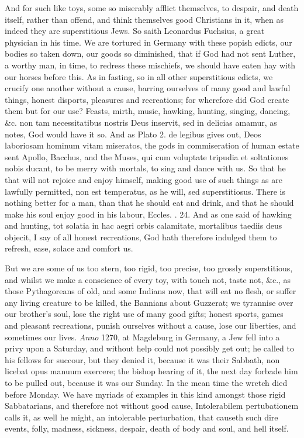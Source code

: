 {And for such like toys, some so miserably afflict themselves, to
despair, and death itself, rather than offend, and think themselves
good Christians in it, when as indeed they are superstitious Jews. So
saith Leonardus Fuchsius, a great physician in his time. We are
tortured in Germany with these popish edicts, our bodies so taken down,
our goods so diminished, that if God had not sent Luther, a worthy man,
in time, to redress these mischiefs, we should have eaten hay with our
horses before this. As in fasting, so in all other superstitious
edicts, we crucify one another without a cause, barring ourselves of
many good and lawful things, honest disports, pleasures and
recreations; for wherefore did God create them but for our use? Feasts,
mirth, music, hawking, hunting, singing, dancing, \&c. non tam
necessitatibus nostris Deus inservit, sed in delicias amamur, as \Seneca
notes, God would have it so. And as Plato 2. de legibus gives out, Deos
laboriosam hominum vitam miseratos, the gods in commiseration of human
estate sent Apollo, Bacchus, and the Muses, qui cum voluptate tripudia
et soltationes nobis ducant, to be merry with mortals, to sing and
dance with us. So that he that will not rejoice and enjoy himself,
making good use of such things as are lawfully permitted, non est
temperatus, as he will, sed superstitiosus. There is nothing better for
a man, than that he should eat and drink, and that he should make his
soul enjoy good in his labour, Eccles. . 24. And as one said of
hawking and hunting, tot solatia in hac aegri orbis calamitate,
mortalibus taediis deus objecit, I say of all honest recreations, God
hath therefore indulged them to refresh, ease, solace and comfort us.

But we are some of us too stern, too rigid, too precise, too grossly
superstitious, and whilst we make a conscience of every toy, with touch
not, taste not, \&c., as those Pythagoreans of old, and some Indians
now, that will eat no flesh, or suffer any living creature to be
killed, the Bannians about Guzzerat; we tyrannise over our brother's
soul, lose the right use of many good gifts; honest sports, games
and pleasant recreations, punish ourselves without a cause, lose
our liberties, and sometimes our lives. \emph{Anno} 1270, at Magdeburg
in Germany, a Jew fell into a privy upon a Saturday, and without help
could not possibly get out; he called to his fellows for succour, but
they denied it, because it was their Sabbath, non licebat opus manuum
exercere; the bishop hearing of it, the next day forbade him to be
pulled out, because it was our Sunday. In the mean time the wretch died
before Monday. We have myriads of examples in this kind amongst those
rigid Sabbatarians, and therefore not without good cause,
Intolerabilem pertubationem \Seneca calls it, as well he might, an
intolerable perturbation, that causeth such dire events, folly,
madness, sickness, despair, death of body and soul, and hell itself.

}
